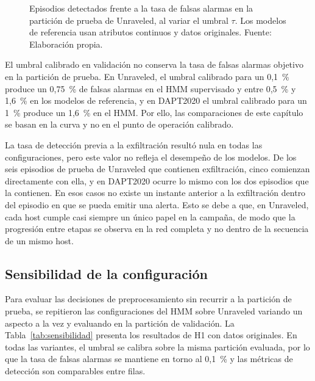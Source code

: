 \begin{figure}[h!]
\caption[Episodios detectados frente a la tasa de falsas alarmas en Unraveled.]{Episodios detectados frente a la tasa de falsas alarmas en la partición de prueba de Unraveled, al variar el umbral $\tau$. Los modelos de referencia usan atributos continuos y datos originales. Fuente: Elaboración propia.}
\label{fig:curva_ttd_fpr}
\end{figure}
\FloatBarrier

El umbral calibrado en validación no conserva la tasa de falsas alarmas objetivo en la partición de prueba. En Unraveled, el umbral calibrado para un 0,1~\% produce un 0,75~\% de falsas alarmas en el HMM supervisado y entre 0,5~\% y 1,6~\% en los modelos de referencia, y en DAPT2020 el umbral calibrado para un 1~\% produce un 1,6~\% en el HMM. Por ello, las comparaciones de este capítulo se basan en la curva y no en el punto de operación calibrado.

La tasa de detección previa a la exfiltración resultó nula en todas las configuraciones, pero este valor no refleja el desempeño de los modelos. De los seis episodios de prueba de Unraveled que contienen exfiltración, cinco comienzan directamente con ella, y en DAPT2020 ocurre lo mismo con los dos episodios que la contienen. En esos casos no existe un instante anterior a la exfiltración dentro del episodio en que se pueda emitir una alerta. Esto se debe a que, en Unraveled, cada host cumple casi siempre un único papel en la campaña, de modo que la progresión entre etapas se observa en la red completa y no dentro de la secuencia de un mismo host.

\subsection{Sensibilidad de la configuración}
\label{sec:res_sensibilidad}
Para evaluar las decisiones de preprocesamiento sin recurrir a la partición de prueba, se repitieron las configuraciones del HMM sobre Unraveled variando un aspecto a la vez y evaluando en la partición de validación. La Tabla~\ref{tab:sensibilidad} presenta los resultados de H1 con datos originales. En todas las variantes, el umbral se calibra sobre la misma partición evaluada, por lo que la tasa de falsas alarmas se mantiene en torno al 0,1~\% y las métricas de detección son comparables entre filas.

